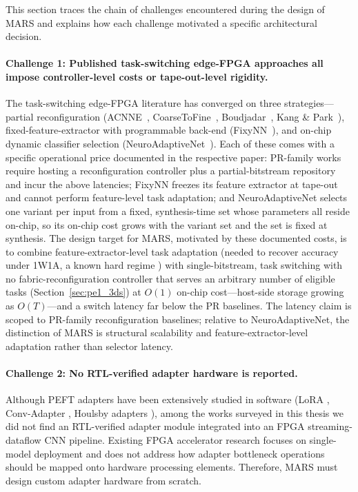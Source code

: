 \documentclass[12pt, a4paper]{report}
\numberwithin{equation}{chapter}
\numberwithin{figure}{chapter}
\numberwithin{table}{chapter}
\numberwithin{algorithm}{chapter}
\begin{document}
This section traces the chain of challenges encountered during the design of MARS and explains how each challenge motivated a specific architectural decision.

\paragraph{Challenge 1: Published task-switching edge-FPGA approaches all impose controller-level costs or tape-out-level rigidity.}
The task-switching edge-FPGA literature has converged on three strategies---partial reconfiguration (ACNNE~\cite{Huang2024ACNNE}, CoarseToFine~\cite{Rangsikunpum2024CoarseToFine}, Boudjadar~\cite{Boudjadar2025DynamicFPGA}, Kang \& Park~\cite{Kang2025RuntimeRobust}), fixed-feature-extractor with programmable back-end (FixyNN~\cite{Whatmough2019FixyNN}), and on-chip dynamic classifier selection (NeuroAdaptiveNet~\cite{ElBouazzaoui2025NeuroAdaptive}). Each of these comes with a specific operational price documented in the respective paper: PR-family works require hosting a reconfiguration controller plus a partial-bitstream repository and incur the above latencies; FixyNN freezes its feature extractor at tape-out and cannot perform feature-level task adaptation; and NeuroAdaptiveNet selects one variant per input from a fixed, synthesis-time set whose parameters all reside on-chip, so its on-chip cost grows with the variant set and the set is fixed at synthesis. The design target for MARS, motivated by these documented costs, is to combine feature-extractor-level task adaptation (needed to recover accuracy under 1W1A, a known hard regime \cite{Rastegari2016XNOR, Hubara2016BinarizedNN}) with single-bitstream, task switching with no fabric-reconfiguration controller that serves an arbitrary number of eligible tasks (Section~\ref{sec:pe1_3ds}) at $O(1)$ on-chip cost---host-side storage growing as $O(T)$---and a switch latency far below the PR baselines. The latency claim is scoped to PR-family reconfiguration baselines; relative to NeuroAdaptiveNet, the distinction of MARS is structural scalability and feature-extractor-level adaptation rather than selector latency.

\paragraph{Challenge 2: No RTL-verified adapter hardware is reported.}
Although PEFT adapters have been extensively studied in software (LoRA \cite{Hu2022LoRA}, Conv-Adapter \cite{Chen2024ConvAdapter}, Houlsby adapters \cite{Houlsby2019Adapters}), among the works surveyed in this thesis we did not find an RTL-verified adapter module integrated into an FPGA streaming-dataflow CNN pipeline. Existing FPGA accelerator research focuses on single-model deployment and does not address how adapter bottleneck operations should be mapped onto hardware processing elements. Therefore, MARS must design custom adapter hardware from scratch.
\end{document}
